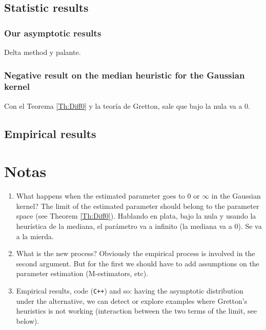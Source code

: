 	\subsection{Statistic results}
			\subsubsection*{Our asymptotic results}
				{\color{orange}Delta method y palante.}
			\subsubsection*{Negative result on the median heuristic for the Gaussian kernel}
				{\color{orange}Con el Teorema \ref{Th:Diff0} y la teor\'{i}a de Gretton, sale que bajo la nula va a $0$.}
	\subsection{Empirical results}	
\section{Notas}
	\begin{enumerate}
		\item What happens when the estimated parameter goes to $0$ or $\infty$ in the Gaussian kernel? The limit of the estimated parameter should belong to the parameter space (see Theorem \ref{Th:Diff0}). {\color{orange}Hablando en plata, bajo la nula y usando la heur\'{i}stica de la mediana, el par\'{a}metro va a infinito (la mediana va a $0$). Se va a la mierda.}
		\item What is the new process? Obviously the empirical process is involved in the second argument. But for the first we should have to add assumptions on the parameter estimation (M-estimators, etc).
		\item Empirical results, code (\verb!C++!) and so: having the asymptotic distribution under the alternative, we can detect or explore examples where Gretton's heuristics is not working (interaction between the two terms of the limit, see below).
	\end{enumerate}